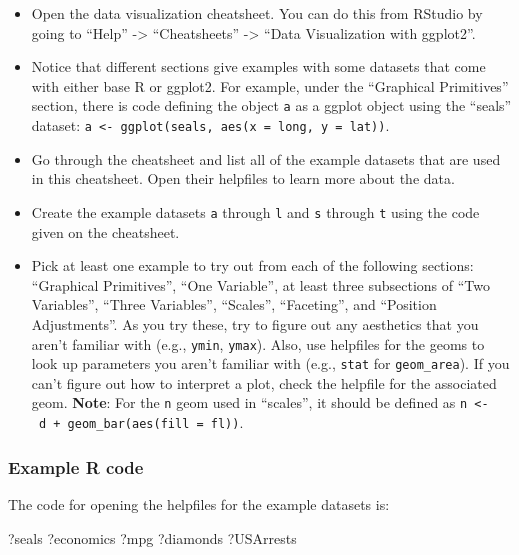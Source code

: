 \documentclass[]{book}
\makeatletter
\newenvironment{Shaded}{\begin{snugshade}}{\end{snugshade}}
\newcommand{\NormalTok}[1]{{#1}}
\providecommand{\tightlist}{%
  \setlength{\itemsep}{0pt}\setlength{\parskip}{0pt}}
\newenvironment{kframe}{%
\medskip{}
\setlength{\fboxsep}{.8em}
 \def\at@end@of@kframe{}%
 \ifinner\ifhmode%
  \def\at@end@of@kframe{\end{minipage}}%
  \begin{minipage}{\columnwidth}%
 \fi\fi%
 \def\FrameCommand##1{\hskip\@totalleftmargin \hskip-\fboxsep
 \colorbox{shadecolor}{##1}\hskip-\fboxsep
     \hskip-\linewidth \hskip-\@totalleftmargin \hskip\columnwidth}%
 \MakeFramed {\advance\hsize-\width
   \@totalleftmargin\z@ \linewidth\hsize
   \@setminipage}}%
 {\par\unskip\endMakeFramed%
 \at@end@of@kframe}
\renewenvironment{Shaded}{\begin{kframe}}{\end{kframe}}
\makeatother
\begin{document}
\begin{itemize}
\tightlist
\item
  Open the data visualization cheatsheet. You can do this from RStudio
  by going to ``Help'' -\textgreater{} ``Cheatsheets'' -\textgreater{}
  ``Data Visualization with ggplot2''.
\item
  Notice that different sections give examples with some datasets that
  come with either base R or ggplot2. For example, under the ``Graphical
  Primitives'' section, there is code defining the object \texttt{a} as
  a ggplot object using the ``seals'' dataset:
  \texttt{a\ \textless{}-\ ggplot(seals,\ aes(x\ =\ long,\ y\ =\ lat))}.
\item
  Go through the cheatsheet and list all of the example datasets that
  are used in this cheatsheet. Open their helpfiles to learn more about
  the data.
\item
  Create the example datasets \texttt{a} through \texttt{l} and
  \texttt{s} through \texttt{t} using the code given on the cheatsheet.
\item
  Pick at least one example to try out from each of the following
  sections: ``Graphical Primitives'', ``One Variable'', at least three
  subsections of ``Two Variables'', ``Three Variables'', ``Scales'',
  ``Faceting'', and ``Position Adjustments''. As you try these, try to
  figure out any aesthetics that you aren't familiar with (e.g.,
  \texttt{ymin}, \texttt{ymax}). Also, use helpfiles for the geoms to
  look up parameters you aren't familiar with (e.g., \texttt{stat} for
  \texttt{geom\_area}). If you can't figure out how to interpret a plot,
  check the helpfile for the associated geom. \textbf{Note}: For the
  \texttt{n} geom used in ``scales'', it should be defined as
  \texttt{n\ \textless{}-\ d\ +\ geom\_bar(aes(fill\ =\ fl))}.
\end{itemize}

\subsubsection{Example R code}\label{example-r-code-7}

The code for opening the helpfiles for the example datasets is:

\begin{Shaded}
\begin{Highlighting}[]
\NormalTok{?seals}
\NormalTok{?economics}
\NormalTok{?mpg}
\NormalTok{?diamonds}
\NormalTok{?USArrests}
\end{Highlighting}
\end{Shaded}
\end{document}
